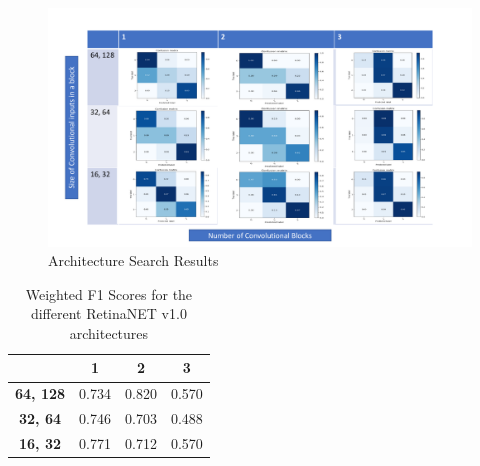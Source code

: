 \documentclass[a4paper]{article}
\begin{document}
        \newpage
        \begin{figure}[h!]
            \centerline{\includegraphics[width=1\textwidth]{../img/results/archi.pdf}}
            \label{figX: Architecture Search Results} 
            \caption{Architecture Search Results}
        \end{figure}

        \begin{table}[!h]
            \centering
                \begin{tabular}{||c || c c c||} 
                \hline
                 & \textbf{1} & \textbf{2} & \textbf{3} \\
                \hline\hline
                \textbf{64, 128} & 0.734 & 0.820  & 0.570 \\
                \textbf{32, 64}  & 0.746 & 0.703  & 0.488 \\
                \textbf{16, 32}  & 0.771 & 0.712  & 0.570 \\
                \hline
                \end{tabular}
            \caption{\label{fig:4} Weighted F1 Scores for the different RetinaNET v1.0 architectures}
        \end{table}
\end{document}
